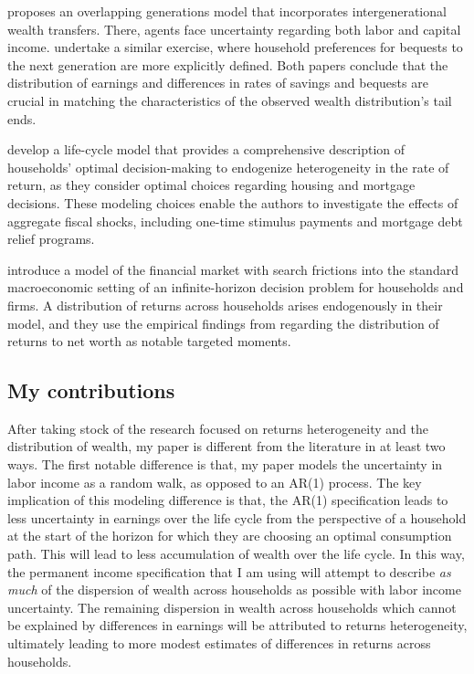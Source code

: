 \par \cite{Benhabib2019} proposes an overlapping generations model that incorporates intergenerational wealth transfers. There, agents face uncertainty regarding both labor and capital income. \cite{jbabml17} undertake a similar exercise, where household preferences for bequests to the next generation are more explicitly defined. Both papers conclude that the distribution of earnings and differences in rates of savings and bequests are crucial in matching the characteristics of the observed wealth distribution's tail ends.

\par \cite{Guler2022} develop a life-cycle model that provides a comprehensive description of households' optimal decision-making to endogenize heterogeneity in the rate of return, as they consider optimal choices regarding housing and mortgage decisions. These modeling choices enable the authors to investigate the effects of aggregate fiscal shocks, including one-time stimulus payments and mortgage debt relief programs.

\par \cite{Menzio2025} introduce a model of the financial market with search frictions into the standard macroeconomic setting of an infinite-horizon decision problem for households and firms. A distribution of returns across households arises endogenously in their model, and they use the empirical findings from \cite{aflgdmlp20} regarding the distribution of returns to net worth as notable targeted moments.

\subsection{My contributions}

\par After taking stock of the research focused on returns heterogeneity and the distribution of wealth, my paper is different from the literature in at least two ways. The first notable difference is that, my paper models the uncertainty in labor income as a random walk, as opposed to an AR(1) process. The key implication of this modeling difference is that, the AR(1) specification leads to less uncertainty in earnings over the life cycle from the perspective of a household at the start of the horizon for which they are choosing an optimal consumption path. This will lead to less accumulation of wealth over the life cycle. In this way, the permanent income specification that I am using will attempt to describe \textit{as much} of the dispersion of wealth across households as possible with labor income uncertainty. The remaining dispersion in wealth across households which cannot be explained by differences in earnings will be attributed to returns heterogeneity, ultimately leading to more modest estimates of differences in returns across households.

